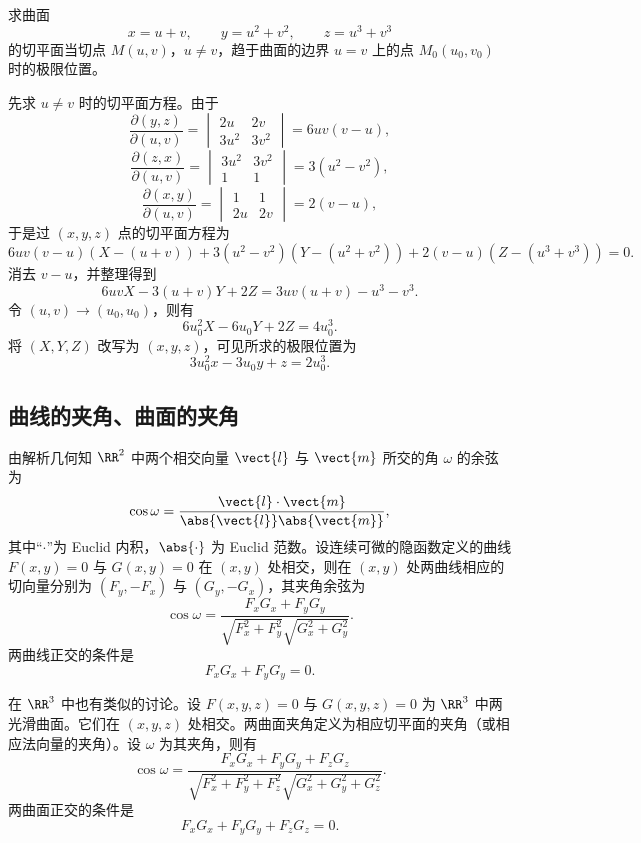 \begin{xexample}[21.1.2]
求曲面
\[
  x=u+v,\qquad y=u^2+v^2,\qquad z=u^3+v^3
\]
的切平面当切点 $M(u,v)$，$u\ne v$，趋于曲面的边界 $u=v$ 上的点 $M_0(u_0,v_0)$ 时的极限位置。
\end{xexample}
\begin{xsolution}
先求 $u\ne v$ 时的切平面方程。由于
\[
  \frac{\partial(y,z)}{\partial(u,v)}
  =\begin{vmatrix}2u&2v\\3u^2&3v^2\end{vmatrix}
  =6uv(v-u),
\]
\[
  \frac{\partial(z,x)}{\partial(u,v)}
  =\begin{vmatrix}3u^2&3v^2\\1&1\end{vmatrix}
  =3(u^2-v^2),
\]
\[
  \frac{\partial(x,y)}{\partial(u,v)}
  =\begin{vmatrix}1&1\\2u&2v\end{vmatrix}
  =2(v-u),
\]
于是过 $(x,y,z)$ 点的切平面方程为
\[
  6uv(v-u)(X-(u+v))+3(u^2-v^2)(Y-(u^2+v^2))
  +2(v-u)(Z-(u^3+v^3))=0.
\]
消去 $v-u$，并整理得到
\[
  6uvX-3(u+v)Y+2Z=3uv(u+v)-u^3-v^3.
\]
令 $(u,v)\to(u_0,u_0)$，则有
\[
  6u_0^2X-6u_0Y+2Z=4u_0^3.
\]
将 $(X,Y,Z)$ 改写为 $(x,y,z)$，可见所求的极限位置为
\[
  3u_0^2x-3u_0y+z=2u_0^3.
\]
\end{xsolution}

\subsection{曲线的夹角、曲面的夹角}

由解析几何知 $\RR^2$ 中两个相交向量 $\vect{l}$ 与 $\vect{m}$ 所交的角 $\omega$ 的余弦为
\[
  \cos\omega=\frac{\vect{l}\cdot\vect{m}}{\abs{\vect{l}}\abs{\vect{m}}},
\]
其中“$\cdot$”为 Euclid 内积，$\abs{\cdot}$ 为 Euclid 范数。设连续可微的隐函数定义的曲线 $F(x,y)=0$ 与 $G(x,y)=0$ 在 $(x,y)$ 处相交，则在 $(x,y)$ 处两曲线相应的切向量分别为 $(F_y,-F_x)$ 与 $(G_y,-G_x)$，其夹角余弦为
\[
  \cos\omega=
  \frac{F_xG_x+F_yG_y}{\sqrt{F_x^2+F_y^2}\sqrt{G_x^2+G_y^2}}.
\]
两曲线正交的条件是
\[
  F_xG_x+F_yG_y=0.
\]

在 $\RR^3$ 中也有类似的讨论。设 $F(x,y,z)=0$ 与 $G(x,y,z)=0$ 为 $\RR^3$ 中两光滑曲面。它们在 $(x,y,z)$ 处相交。两曲面夹角定义为相应切平面的夹角（或相应法向量的夹角）。设 $\omega$ 为其夹角，则有
\[
  \cos\omega=
  \frac{F_xG_x+F_yG_y+F_zG_z}
  {\sqrt{F_x^2+F_y^2+F_z^2}\sqrt{G_x^2+G_y^2+G_z^2}}.
\]
两曲面正交的条件是
\[
  F_xG_x+F_yG_y+F_zG_z=0.
\]


